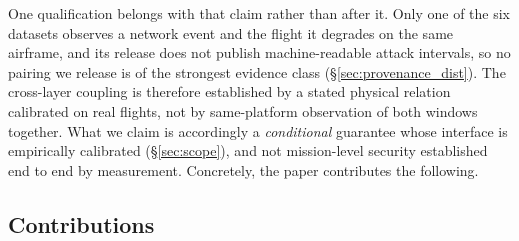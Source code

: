One qualification belongs with that claim rather than after it. Only one of the
six datasets observes a network event and the flight it degrades on the same
airframe, and its release does not publish machine-readable attack intervals, so
no pairing we release is of the strongest evidence class
(\S\ref{sec:provenance_dist}). The cross-layer coupling is therefore established
by a stated physical relation calibrated on real flights, not by same-platform
observation of both windows together. What we claim is accordingly a
\emph{conditional} guarantee whose interface is empirically calibrated
(\S\ref{sec:scope}), and not mission-level security established end to end by
measurement. Concretely, the paper contributes the following.

\subsection*{Contributions}

